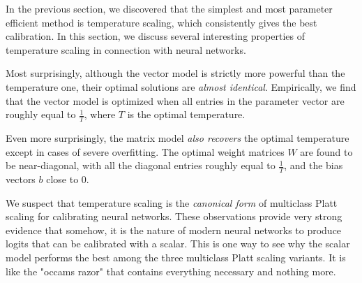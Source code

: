 
In the previous section, we discovered that the simplest and most parameter efficient method is temperature scaling, which consistently gives the best calibration. In this section, we discuss several interesting properties of temperature scaling in connection with neural networks.

Most surprisingly, although the vector model is strictly more powerful than the temperature one, their optimal solutions are \emph{almost identical}. Empirically, we find that the vector model is optimized when all entries in the parameter vector are roughly equal to $\frac{1}{T}$, where $T$ is the optimal temperature. 

Even more surprisingly, the matrix model \emph{also recovers} the optimal temperature except in cases of severe overfitting. The optimal weight matrices $W$ are found to be near-diagonal, with all the diagonal entries roughly equal to $\frac{1}{T}$, and the bias vectors $b$ close to 0. 

We suspect that temperature scaling is the \emph{canonical form} of multiclass Platt scaling for calibrating neural networks. These observations provide very strong evidence that somehow, it is the nature of modern neural networks to produce logits that can be calibrated with a scalar. 
This is one way to see why the scalar model performs the best among the three multiclass Platt scaling variants. It is like the "occams razor" that contains everything necessary and nothing more. 

